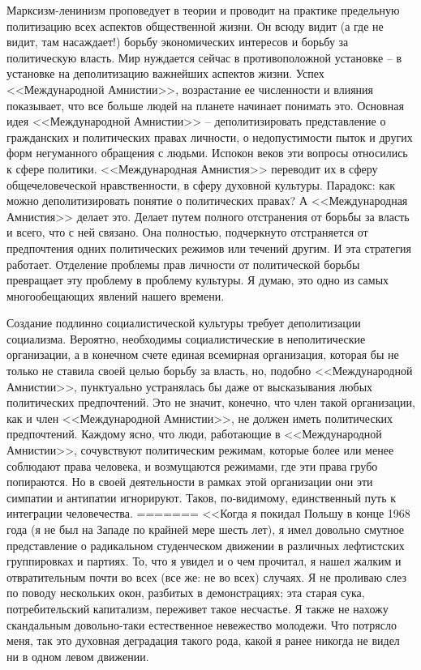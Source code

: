 \documentclass{book}
\begin{document}
{Марксизм‑ленинизм проповедует в теории и проводит на практике предельную политизацию всех аспектов обществен­ной жизни. Он всюду видит (а где не видит, там насаждает!) борьбу экономических интересов и борьбу за политическую власть. Мир нуждается сейчас в противоположной установке -- в установке на деполитизацию  важнейших аспектов жизни. Успех <<Международной Амнистии>>, возрастание ее численно­сти и влияния показывает, что все больше людей на планете начи­нает понимать это. Основная идея <<Международной Амнистии>> -- деполитизировать представление о гражданских и поли­тических правах личности, о недопустимости пыток и других форм негуманного обращения с людьми. Испокон веков эти вопросы относились к сфере политики. <<Международная Амни­стия>> переводит их в сферу общечеловеческой нравственности, в сферу духовной культуры. Парадокс: как можно деполитизи­ровать понятие о политических  правах? А <<Международная Амнистия>> делает это. Делает путем полного отстранения от борьбы за власть  и всего, что с ней связано. Она полностью, подчеркнуто отстраняется от предпочтения одних политиче­ских режимов или течений другим. И эта стратегия работает. Отделение проблемы прав личности от политической борьбы превращает эту проблему в проблему культуры. Я думаю, это одно из самых многообещающих явлений нашего времени.

Создание подлинно социалистической культуры требует деполитизации социализма. Вероятно, необходимы социалисти­ческие в неполитические  организации, а в конечном счете еди­ная всемирная организация, которая бы не только не ставила своей целью борьбу за власть, но, подобно <<Международной Амнистии>>, пунктуально устранялась бы даже от высказывания любых политических предпочтений. Это не значит, конеч­но, что член такой организации, как и член <<Международной Амнистии>>, не должен иметь  политических предпочтений. Каж­дому ясно, что люди, работающие в <<Международной Амни­стии>>, сочувствуют политическим режимам, которые более или менее соблюдают права человека, и возмущаются режимами, где эти права грубо попираются. Но в своей деятельности в рам­ках этой организации они эти симпатии и антипатии игнорируют. Таков, по‑видимому, единственный путь к интеграции челове­чества.
=======
<<Когда я покидал Польшу в конце 1968 года (я не был на Западе по крайней мере шесть лет), я имел довольно смутное представление о радикальном студенческом движении в различ­ных лефтистских группировках и партиях. То, что я увидел и о чем прочитал, я нашел жалким и отвратительным почти во всех (все же: не во всех) случаях. Я не проливаю слез по пово­ду нескольких окон, разбитых в демонстрациях; эта старая сука, потребительский капитализм, переживет такое несчастье. Я также не нахожу скандальным довольно-таки естественное невежество молодежи. Что потрясло меня, так это духовная деградация такого рода, какой я ранее никогда не видел ни в одном левом движении.

}
\end{document}
